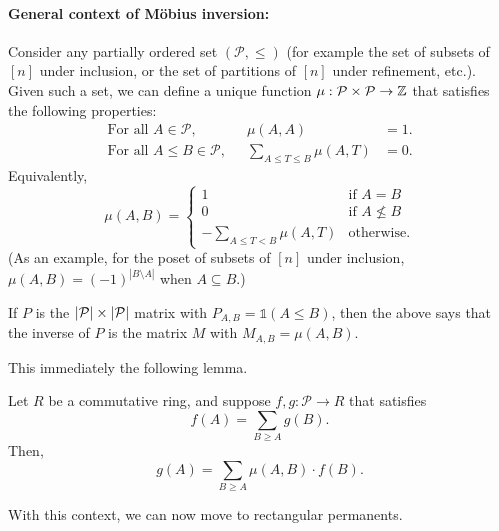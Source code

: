 \paragraph{General context of M\"obius inversion:} Consider any partially ordered set $(\mathcal{P}, \leq)$ (for example the set of subsets of $[n]$ under inclusion, or the set of partitions of $[n]$ under refinement, etc.). Given such a set, we can define a unique \Mobius{} function $\mu: \mathcal{P}\times \mathcal{P} \rightarrow \mathbb{Z}$ that satisfies the following properties:
\begin{align*}
\text{For all $A \in \mathcal{P}$,}& &\mu(A, A)  &= 1.\\
\text{For all $A\leq B \in \mathcal{P}$,}& &\sum_{A \leq T \leq B} \mu(A, T) &= 0.
\end{align*}
\noindent
Equivalently, 
\[
\mu(A,B) = \begin{cases}
  1 & \text{if $A = B$}\\
  0 & \text{if $A \nleq B$}\\
  -\sum_{A \leq T < B} \mu(A, T) & \text{otherwise}.
  \end{cases}
\]
(As an example, for the poset of subsets of $[n]$ under inclusion, $\mu(A,B) = (-1)^{|B \setminus A|}$ when $A \subseteq B$.)

If $P$ is the $\left|\mathcal{P}\right| \times \left|\mathcal{P}\right|$ matrix with $P_{A,B} = \mathbb{1}(A \leq B)$, then the above says that the inverse of $P$ is the matrix $M$ with $M_{A,B} = \mu(A,B)$. 

This immediately the following lemma. 

\begin{lemma}
  Let $R$ be a commutative ring, and suppose $f,g: \mathcal{P} \rightarrow R$ that satisfies
  \[
  f(A) = \sum_{B \geq A} g(B).
  \]
  Then, 
  \[
  g(A) = \sum_{B \geq A} \mu(A,B) \cdot f(B).
  \]
\end{lemma}

\noindent
With this context, we can now move to rectangular permanents. 

